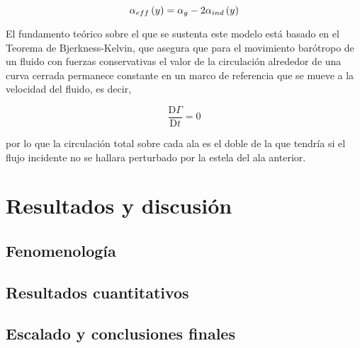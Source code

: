 \begin{equation}
\alpha_{eff}\left(y\right) = \alpha_{g} - 2\alpha_{ind}\left(y\right)
\LABEQ{alphaInd}
\end{equation}

El fundamento teórico sobre el que se sustenta este modelo está basado en el Teorema de Bjerkness-Kelvin, que asegura que para el movimiento barótropo de un fluido con fuerzas conservativas el valor de la circulación alrededor de una curva cerrada permanece constante en un marco de referencia que se mueve a la velocidad del fluido, es decir,

\begin{equation}
\dfrac{\mathrm{D}\Gamma}{\mathrm{D}t} = 0
\end{equation}


por lo que la circulación total sobre cada ala es el doble de la que tendría si el flujo incidente no se hallara perturbado por la estela del ala anterior. 

\section{Resultados y discusión}


\subsection{Fenomenología}

\subsection{Resultados cuantitativos}

\subsection{Escalado y conclusiones finales}






